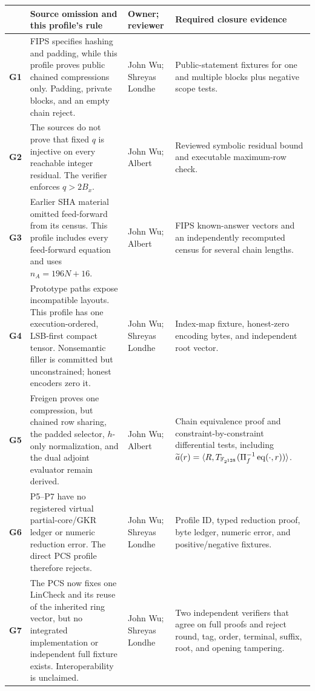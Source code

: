 \begingroup\footnotesize
\setlength{\tabcolsep}{2.5pt}
\renewcommand{\arraystretch}{0.95}
\begin{tabularx}{\linewidth}{@{}>{\raggedright\arraybackslash}p{0.25in}
  >{\raggedright\arraybackslash}X
  >{\raggedright\arraybackslash}p{0.96in}
  >{\raggedright\arraybackslash}p{1.29in}@{}}
\toprule
& \textbf{Source omission and this profile's rule} &
\textbf{Owner; reviewer} & \textbf{Required closure evidence}\\
\midrule
\textbf{G1} & FIPS specifies hashing and padding, while this profile proves
public chained compressions only.  Padding, private blocks, and an empty chain
reject. & John Wu; Shreyas Londhe & Public-statement fixtures for one and
multiple blocks plus negative scope tests.\\
\textbf{G2} & The sources do not prove that fixed $q$ is injective on every
reachable integer residual.  The verifier enforces $q>2B_x$. & John Wu;
Albert & Reviewed symbolic residual bound and executable maximum-row check.\\
\textbf{G3} & Earlier SHA material omitted feed-forward from its census.  This
profile includes every feed-forward equation and uses $n_A=196N+16$. &
John Wu; Albert & FIPS known-answer vectors and an independently recomputed
census for several chain lengths.\\
\textbf{G4} & Prototype paths expose incompatible layouts.  This profile has
one execution-ordered, LSB-first compact tensor.  Nonsemantic filler is committed but
unconstrained; honest encoders zero it. & John Wu; Shreyas Londhe &
Index-map fixture, honest-zero encoding bytes, and independent root vector.\\
\textbf{G5} & Freigen proves one compression, but chained row sharing, the
padded selector, $h$-only normalization, and the dual adjoint evaluator remain derived. &
John Wu; Albert & Chain equivalence proof and constraint-by-constraint
differential tests, including
$\widetilde a(r)=\langle R,T_{\mathbb F_{2^{128}}}(\Pi_f^{-1}\operatorname{eq}(\cdot,r))\rangle$.\\
\hypertarget{gap:sha-g6}{\textbf{G6}} & P5--P7 have no registered virtual
partial-core/GKR ledger or numeric reduction error.  The direct PCS profile
therefore rejects. & John Wu; Shreyas Londhe & Profile ID, typed reduction
proof, byte ledger, numeric error, and positive/negative fixtures.\\
\hypertarget{gap:sha-g7}{\textbf{G7}} & The PCS now fixes one LinCheck and its
reuse of the inherited ring vector, but no integrated implementation or
independent full fixture exists.  Interoperability is unclaimed. & John Wu;
Shreyas Londhe & Two independent verifiers that agree on full proofs and reject
round, tag, order, terminal, suffix, root, and opening tampering.\\
\bottomrule
\end{tabularx}
\endgroup
